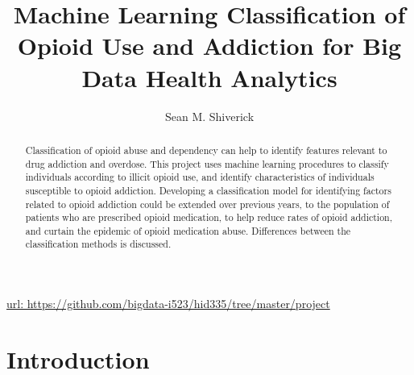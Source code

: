 \documentclass[sigconf]{acmart}
\begin{document}
\title{Machine Learning Classification of Opioid Use and Addiction
for Big Data Health Analytics}

  \author{Sean M. Shiverick}

\renewcommand{\shortauthors}{S.M. Shiverick}


\begin{abstract}
Classification of opioid abuse and dependency can help to identify features
relevant to drug addiction and overdose. This project uses machine learning
procedures to classify individuals according to illicit opioid use, and
identify characteristics of individuals susceptible to opioid addiction.
Developing a classification model for identifying factors related to opioid 
addiction could be extended over previous years, to the population of
patients who are prescribed opioid medication, to help reduce rates of 
opioid addiction, and curtain the epidemic of opioid medication abuse.  
Differences between the classification methods is discussed.

\end{abstract}


\maketitle

\url{url: https://github.com/bigdata-i523/hid335/tree/master/project}

\section{Introduction}
\end{document}
